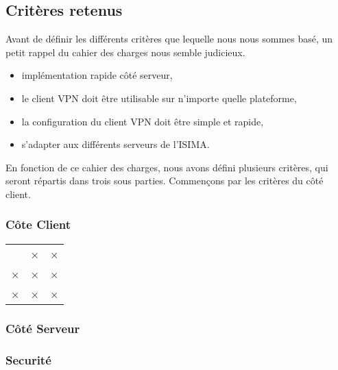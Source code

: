 \subsection{Critères retenus}

Avant de définir les différents critères que lequelle nous nous sommes basé, un petit rappel du cahier des charges nous semble judicieux.


\begin{itemize}
 	\item implémentation rapide côté serveur,
	\item le client VPN doit être utilisable sur n'importe quelle plateforme,
	\item la configuration du client VPN doit être simple et rapide,
	\item s'adapter aux différents serveurs de l'ISIMA.
\end{itemize}


En fonction de ce cahier des charges, nous avons défini plusieurs critères, qui seront répartis dans trois sous parties. Commençons par les critères du côté client. 

\subsubsection{Côte Client}

\begin{center}
\begin{longtable}{lll}
 & × & × \\ 
× & × & × \\ 
× & × & ×
\end{longtable}
\end{center}


\subsubsection{Côté Serveur}

\subsubsection{Securité}
